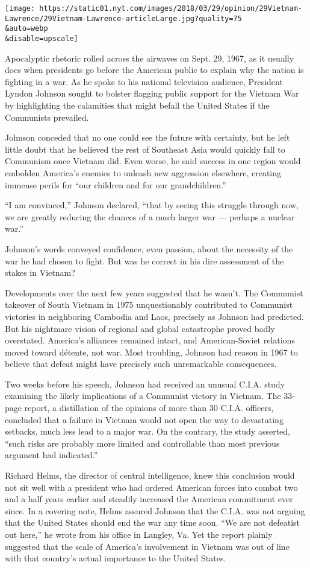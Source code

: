 \texttt{[image: https://static01.nyt.com/images/2018/03/29/opinion/29Vietnam-Lawrence/29Vietnam-Lawrence-articleLarge.jpg?quality=75\\\&auto=webp\\\&disable=upscale]}

Apocalyptic rhetoric rolled across the airwaves on Sept. 29, 1967, as it
usually does when presidents go before the American public to explain
why the nation is fighting in a war. As he spoke to his national
television audience, President Lyndon Johnson sought to bolster flagging
public support for the Vietnam War by highlighting the calamities that
might befall the United States if the Communists prevailed.

Johnson conceded that no one could see the future with certainty, but he
left little doubt that he believed the rest of Southeast Asia would
quickly fall to Communism once Vietnam did. Even worse, he said success
in one region would embolden America's enemies to unleash new aggression
elsewhere, creating immense perils for ``our children and for our
grandchildren.''

``I am convinced,'' Johnson declared, ``that by seeing this struggle
through now, we are greatly reducing the chances of a much larger war
--- perhaps a nuclear war.''

Johnson's words conveyed confidence, even passion, about the necessity
of the war he had chosen to fight. But was he correct in his dire
assessment of the stakes in Vietnam?

Developments over the next few years suggested that he wasn't. The
Communist takeover of South Vietnam in 1975 unquestionably contributed
to Communist victories in neighboring Cambodia and Laos, precisely as
Johnson had predicted. But his nightmare vision of regional and global
catastrophe proved badly overstated. America's alliances remained
intact, and American-Soviet relations moved toward détente, not war.
Most troubling, Johnson had reason in 1967 to believe that defeat might
have precisely such unremarkable consequences.

Two weeks before his speech, Johnson had received an unusual C.I.A.
study examining the likely implications of a Communist victory in
Vietnam. The 33-page report, a distillation of the opinions of more than
30 C.I.A. officers, concluded that a failure in Vietnam would not open
the way to devastating setbacks, much less lead to a major war. On the
contrary, the study asserted, ``such risks are probably more limited and
controllable than most previous argument had indicated.''

Richard Helms, the director of central intelligence, knew this
conclusion would not sit well with a president who had ordered American
forces into combat two and a half years earlier and steadily increased
the American commitment ever since. In a covering note, Helms assured
Johnson that the C.I.A. was not arguing that the United States should
end the war any time soon. ``We are not defeatist out here,'' he wrote
from his office in Langley, Va. Yet the report plainly suggested that
the scale of America's involvement in Vietnam was out of line with that
country's actual importance to the United States.

